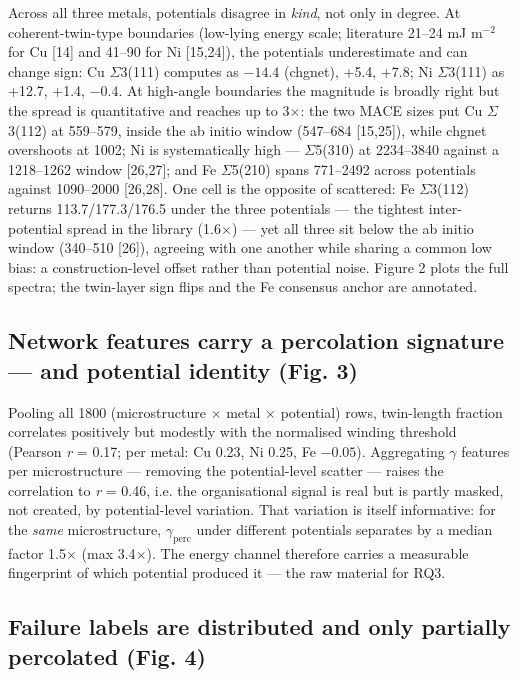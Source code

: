 \documentclass[11pt]{article}
\begin{document}
Across all three metals, potentials disagree in \textit{kind}, not only in degree. At coherent-twin-type boundaries (low-lying energy scale; literature 21--24 mJ m$^{-2}$ for Cu [14] and 41--90 for Ni [15,24]), the potentials underestimate and can change sign: Cu $\Sigma$3(111) computes as $-14.4$ (chgnet), +5.4, +7.8; Ni $\Sigma$3(111) as +12.7, +1.4, $-0.4$. At high-angle boundaries the magnitude is broadly right but the spread is quantitative and reaches up to 3$\times$: the two MACE sizes put Cu $\Sigma$3(112) at 559--579, inside the ab initio window (547--684 [15,25]), while chgnet overshoots at 1002; Ni is systematically high --- $\Sigma$5(310) at 2234--3840 against a 1218--1262 window [26,27]; and Fe $\Sigma$5(210) spans 771--2492 across potentials against 1090--2000 [26,28]. One cell is the opposite of scattered: Fe $\Sigma$3(112) returns 113.7/177.3/176.5 under the three potentials --- the tightest inter-potential spread in the library (1.6$\times$) --- yet all three sit below the ab initio window (340--510 [26]), agreeing with one another while sharing a common low bias: a construction-level offset rather than potential noise. Figure 2 plots the full spectra; the twin-layer sign flips and the Fe consensus anchor are annotated.

\subsection{Network features carry a percolation signature --- and potential identity (Fig. 3)}

Pooling all 1800 (microstructure $\times$ metal $\times$ potential) rows, twin-length fraction correlates positively but modestly with the normalised winding threshold (Pearson \textit{r} = 0.17; per metal: Cu 0.23, Ni 0.25, Fe $-0.05$). Aggregating $\gamma$ features per microstructure --- removing the potential-level scatter --- raises the correlation to \textit{r} = 0.46, i.e. the organisational signal is real but is partly masked, not created, by potential-level variation. That variation is itself informative: for the \textit{same} microstructure, $\gamma_{\mathrm{perc}}$ under different potentials separates by a median factor 1.5$\times$ (max 3.4$\times$). The energy channel therefore carries a measurable fingerprint of which potential produced it --- the raw material for RQ3.

\subsection{Failure labels are distributed and only partially percolated (Fig. 4)}
\end{document}
